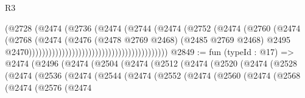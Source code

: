 \begin{lexlean}{R3}
\begin{coremodule}
                                                              (@2728
                                                                (@2474
                                                                  (@2736
                                                                    (@2474
                                                                      (@2744
                                                                        (@2474
                                                                          (@2752
                                                                            (@2474
                                                                              (@2760
                                                                                (@2474
                                                                                  (@2768
                                                                                    (@2474
                                                                                      (@2476
                                                                                        (@2478
                                                                                          @2769
                                                                                          @2468)
                                                                                        (@2485
                                                                                          @2769
                                                                                          @2468)
                                                                                        @2495
                                                                                        @2470))))))))))))))))))))))))))))))))))))))))))
@2849 := fun (typeId : @17) =>
  @2474
    (@2496
      (@2474
        (@2504
          (@2474
            (@2512
              (@2474
                (@2520
                  (@2474
                    (@2528
                      (@2474
                        (@2536
                          (@2474
                            (@2544
                              (@2474
                                (@2552
                                  (@2474
                                    (@2560
                                      (@2474
                                        (@2568
                                          (@2474
                                            (@2576
                                              (@2474

\end{coremodule}
\end{lexlean}

